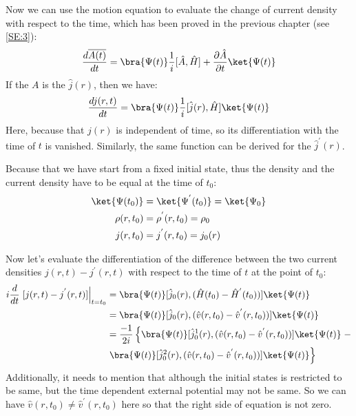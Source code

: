 Now we can use the motion equation to evaluate the change of current
density with respect to the time, which has been proved in the
previous chapter (see \ref{SE:3}):
\begin{equation}\label{}
\frac{d \overline{A(t)}}{dt} =
\bra{\Psi(t)}\frac{1}{i}[\hat{A},\hat{H}]
+\frac{\partial\hat{A}}{\partial t}\ket{\Psi(t)}
\end{equation}
If the $A$ is the $\hat{j}(r)$, then we have:
\begin{equation}\label{}
\frac{d j(r,t)}{dt} =
\bra{\Psi(t)}\frac{1}{i}[\hat{j}(r),\hat{H}]\ket{\Psi(t)}
\end{equation}
Here, because that $\hat{j}(r)$ is independent of time,  so its
differentiation with the time of $t$ is vanished. Similarly, the
same function can be derived for the $\hat{j}^{'}(r)$.

Because that we have start from a fixed initial state, thus the
density and the current density have to be equal at the time of
$t_{0}$:
\begin{align}\label{}
\ket{\Psi(t_{0})} &= \ket{\Psi^{'}(t_{0})} = \ket{\Psi_{0}}
\nonumber \\
\rho(r,t_{0})&= \rho^{'}(r,t_{0}) = \rho_{0} \nonumber \\
j(r,t_{0})   &= j^{'}(r,t_{0}) = j_{0}(r)
\end{align}

Now let's evaluate the differentiation of the difference between the
two current densities $j(r,t)-j^{'}(r,t)$ with respect to the time of
$t$ at the point of $t_{0}$:
\begin{align}\label{TDDFTeq:4}
i\frac{d}{dt}\left.[j(r,t)-j^{'}(r,t)]\right|_{t=t_{0}}
&=\bra{\Psi(t)}[\hat{j}_{0}(r),(\hat{H}(t_{0})-\hat{H}^{'}(t_{0}))]
\ket{\Psi(t)} \nonumber \\
&= \bra{\Psi(t)}[\hat{j}_{0}(r),(\hat{v}(r, t_{0})-\hat{v}^{'}(r,
t_{0}))]\ket{\Psi(t)}
\nonumber \\
&= \frac{-1}{2i}\left\{\bra{\Psi(t)}[\hat{j}_{0}^{1}(r),(\hat{v}(r,
t_{0})-\hat{v}^{'}(r, t_{0}))]\ket{\Psi(t)}\right. - \nonumber \\
& \left. \bra{\Psi(t)}[\hat{j}_{0}^{2}(r),(\hat{v}(r,
t_{0})-\hat{v}^{'}(r, t_{0}))]\ket{\Psi(t)}\right\}
\end{align}
Additionally, it needs to mention that although the initial states is
restricted to be same, but the time dependent external potential may
not be same. So we can have $\hat{v}(r, t_{0}) \neq \hat{v}^{'}(r,
t_{0})$ here so that the right side of equation is not zero. 


